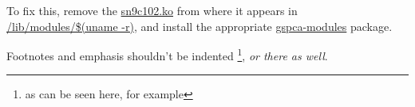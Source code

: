 \documentclass{article}         %
\begin{document}
To fix this, remove the \url{sn9c102.ko} from where it appears in
\url{/lib/modules/$(uname -r)},  %
and install the appropriate \url{gspca-modules} package.

Footnotes and emphasis shouldn't be indented \footnote{as can be seen here,
for example}, \emph{or there
as well}.
\end{document}
